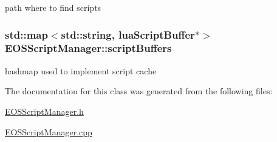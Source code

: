 path where to find scripts 

\hypertarget{classEOSScriptManager_5cb3f437eb3fbc6d770a978124fda515}{
\subsubsection[{scriptBuffers}]{\setlength{\rightskip}{0pt plus 5cm}std::map$<$std::string, {\bf luaScriptBuffer}$\ast$$>$ {\bf EOSScriptManager::scriptBuffers}}}
\label{classEOSScriptManager_5cb3f437eb3fbc6d770a978124fda515}


hashmap used to implement script cache 



The documentation for this class was generated from the following files:\begin{CompactItemize}
\item 
\hyperlink{EOSScriptManager_8h}{EOSScriptManager.h}\item 
\hyperlink{EOSScriptManager_8cpp}{EOSScriptManager.cpp}\end{CompactItemize}
